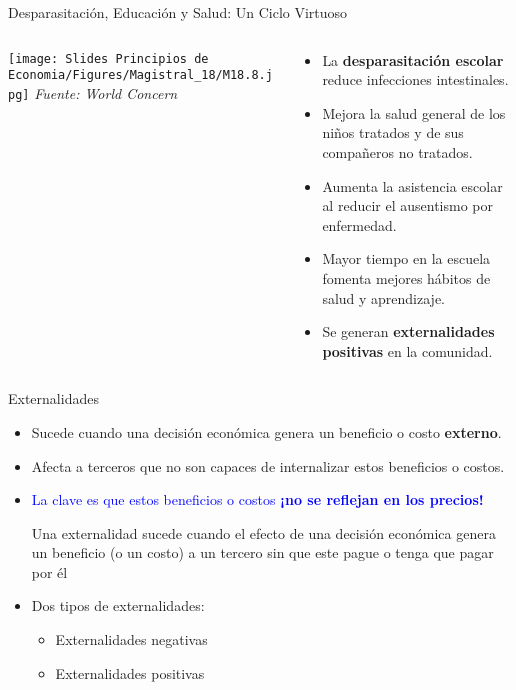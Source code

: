 \documentclass{beamer}
\begin{document}
\begin{frame}{Desparasitación, Educación y Salud: Un Ciclo Virtuoso}
    \small
    \begin{columns}
    \begin{column}{0.5\textwidth}
        \texttt{[image: Slides Principios de Economia/Figures/Magistral\_18/M18.8.jpg]}
        \tiny{\centering \textit{Fuente: World Concern}}
    \end{column}
    \begin{column}{0.5\textwidth}
        \begin{itemize}
        \item La \textbf{desparasitación escolar} reduce infecciones intestinales.
        \item Mejora la salud general de los niños tratados y de sus compañeros no tratados.
        \item Aumenta la asistencia escolar al reducir el ausentismo por enfermedad.
        \item Mayor tiempo en la escuela fomenta mejores hábitos de salud y aprendizaje.
        \item Se generan \textbf{externalidades positivas} en la comunidad.
        \end{itemize}
    \end{column}
    \end{columns}
\end{frame}

\begin{frame}{Externalidades}
    \begin{itemize}
        \item Sucede cuando una decisión económica genera un beneficio o costo \textbf{externo}.
        \item Afecta a terceros que no son capaces de internalizar estos beneficios o costos.
        \item  \textcolor{blue}{La clave es que estos beneficios o costos \textbf{¡no se reflejan en los precios!}}
        \begin{boxB}
            \centering
            Una externalidad sucede cuando el efecto de una decisión económica genera un beneficio (o un costo) a un tercero sin que este pague o tenga que pagar por él
        \end{boxB}
        \item Dos tipos de externalidades: 
        \begin{itemize}
            \item Externalidades negativas
            \vspace{1mm}
            \item Externalidades positivas
        \end{itemize}   
    \end{itemize}
\end{frame}
\end{document}
